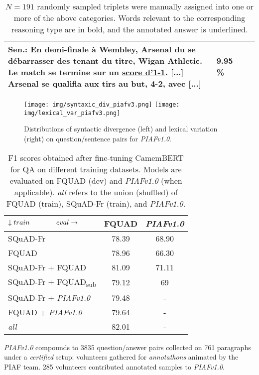 \documentclass[10pt, a4paper]{article}
\begin{document}
\begin{table*}
\begin{center}
\begin{tabular}{ p{6em} p{13em} p{20em} r}
    Sen.: En demi-finale à Wembley, Arsenal du se débarrasser des tenant du titre, Wigan Athletic. Le match se \textbf{termine sur un \underline{score d'1-1}}. [...] Arsenal se \textbf{qualifia aux tirs au but, 4-2}, avec [...]
    & 9.95 \%\\
    \toprule
    \end{tabular}
\end{center}
\caption{$N=191$  randomly sampled triplets were manually assigned into  one  or  more  of  the  above  categories. Words relevant  to  the  corresponding reasoning type are in bold, and the annotated answer is underlined.}
\label{tab:manual}
\end{table*}

\begin{figure*}
	\centering
	\texttt{[image: img/syntaxic\_div\_piafv3.png]}
	\texttt{[image: img/lexical\_var\_piafv3.png]}
	\caption{Distributions of syntactic divergence (left) and lexical variation (right) on question/sentence pairs for \emph{PIAFv1.0}.}
	\label{fig:autometrics}
\end{figure*}


\begin{table}
    \centering
    \begin{tabular}{l|c|c}
$\downarrow train \hphantom{blablabla}eval\rightarrow$& FQUAD & \emph{PIAFv1.0} \\
    \hline
    SQuAD-Fr & 78.39 & 68.90 \\\hline
FQUAD &78.96 & 66.30\\\hline
    SQuAD-Fr + FQUAD & 81.09 & 71.11\\\hline
    SQuAD-Fr + FQUAD\textsubscript{sub} & 79.12 & 69 \\
    \hline
    SQuAD-Fr + \emph{PIAFv1.0} & 79.48 & -\\
    \hline
    FQUAD + \emph{PIAFv1.0} & 79.64 & -\\
    \hline
    \emph{all} & 82.01 & -\\
    \end{tabular}
    \caption{F1 scores obtained after fine-tuning CamemBERT for QA on different training datasets. Models are evaluated on FQUAD (dev) and \emph{PIAFv1.0} (when applicable). \emph{all} refers to the union (shuffled) of FQUAD (train), SQuAD-Fr (train), and \emph{PIAFv1.0.}}
    \label{tab:results}
\end{table}

\emph{PIAFv1.0} compounds to 3835 question/answer pairs collected on 761 paragraphs under a \emph{certified} setup: volunteers gathered for \emph{annotathons} animated by the PIAF team. 285 volunteers contributed annotated samples to \emph{PIAFv1.0}.
\end{document}
